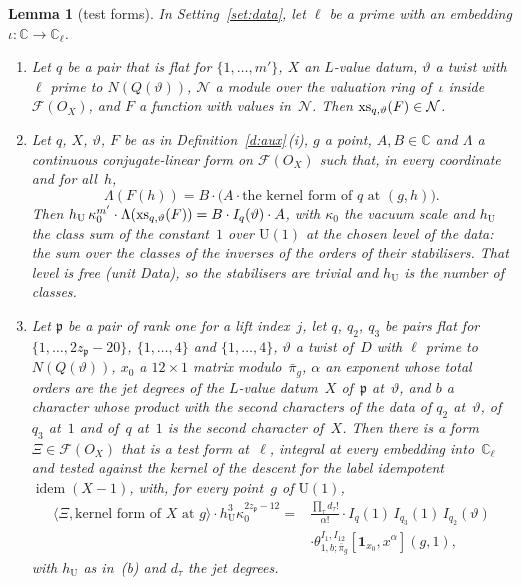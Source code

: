 \documentclass[11pt,a4paper]{article}
\newcommand{\kw}[1]{\emph{#1}}
\newcommand{\m}[1]{\mbox{$#1$}}        %
\theoremstyle{plainx}
\newtheorem{lemma}[theorem]{Lemma}
\theoremstyle{uprightx}
\newcommand{\CC}{\mathbb{C}}
\newcommand{\UU}{\mathrm{U}}
\newcommand{\ip}[2]{\langle #1,#2\rangle}
\newcommand{\tk}[7]{\theta^{#1,#2}_{#3,#4;#5}[#6,#7]}
\newcommand{\FormVx}[1]{\mathcal{F}(#1)}
\newcommand{\idem}{\operatorname{idem}}
\newcommand{\clU}{h_{\UU}}                    %
\newcommand{\ialg}[2]{I_{#1}(#2)}
\begin{document}
\begin{lemma}[test forms]\label{l:test}
In Setting~\ref{set:data}, let $\ell$ be a prime with an embedding \m{\iota\colon\CC\to\CC_\ell}.
\begin{enumerate}[label=\textup{(\alph*)},leftmargin=2.3em,itemsep=2pt]
\item Let $q$ be a pair that is flat for \m{\{1,\dots,m'\}}, $X$ an $L$-value datum, $\vartheta$ a twist with
$\ell$ prime to \m{N(Q(\vartheta))}, $\mathcal{N}$ a module over the valuation ring of~$\iota$ inside \m{\FormVx{O_X}}, and $F$
a function with values in~$\mathcal{N}$. Then \m{\xiSum{q}{\vartheta}{F}\in\mathcal{N}}.
\item Let $q$, $X$, $\vartheta$, $F$ be as in Definition~\ref{d:aux}\,(i), $g$ a point, \m{A,B\in\CC} and $\Lambda$ a
continuous conjugate-linear form on \m{\FormVx{O_X}} such that, in every coordinate and for all~$h$,
\[\Lambda(F(h))=B\cdot\bigl(A\cdot\text{the kernel form of }q\text{ at }(g,h)\bigr).\]
Then \m{\clU\,\kappa_0^{m'}\cdot\Lambda(\xiSum{q}{\vartheta}{F})=B\cdot\ialg{q}{\vartheta}\cdot A}, with \m{\kappa_0} the vacuum
scale and \m{\clU} the class sum of the constant~$1$ over \m{\UU(1)} at the chosen level of the data: the sum over
the classes of the inverses of the orders of their stabilisers. That level is free (unit \emph{Data}), so the
stabilisers are trivial and \m{\clU} is the number of classes.
\item Let $\mathfrak{p}$ be a pair of rank one for a lift index~$j$, let $q$, $q_2$, $q_3$ be pairs flat for
\m{\{1,\dots,2z_{\mathfrak{p}}-20\}}, \m{\{1,\dots,4\}} and \m{\{1,\dots,4\}}, $\vartheta$ a twist of~$D$ with $\ell$ prime to
\m{N(Q(\vartheta))}, $x_0$ a \m{12\times1} matrix modulo~\m{\bar\pi_g}, $\alpha$ an exponent whose total orders are the jet
degrees of the $L$-value datum~$X$ of~$\mathfrak{p}$ at~$\vartheta$, and $b$ a character whose product with the second characters
of the data of $q_2$ at~$\vartheta$, of $q_3$ at~$1$ and of~$q$ at~$1$ is the second character of~$X$. Then there is a
form \m{\Xi\in\FormVx{O_X}} that is a \kw{test form at~$\ell$}, integral at every embedding into~$\CC_\ell$ and tested
against the kernel of the descent for the label idempotent \m{\idem(X-1)}, with, for every point~$g$ of \m{\UU(1)},
\begin{align*}
\ip{\Xi}{\text{kernel form of }X\text{ at }g}\cdot\clU^{3}\kappa_0^{2z_{\mathfrak{p}}-12}
={}&\frac{\prod_\tau d_\tau!}{\alpha!}\cdot\ialg{q}{1}\,\ialg{q_3}{1}\,\ialg{q_2}{\vartheta}\\
&\cdot\tk{I_1}{I_{12}}{1}{b}{\bar\pi_g}{\mathbf{1}_{x_0}}{x^{\alpha}}(g,1),
\end{align*}
with \m{\clU} as in~(b) and $d_\tau$ the jet degrees.
\end{enumerate}
\end{lemma}
\end{document}
